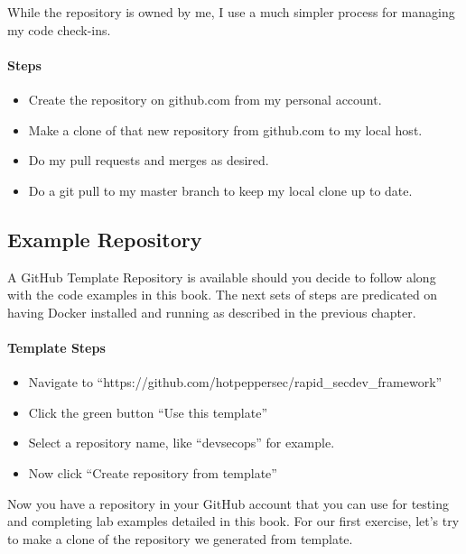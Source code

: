 \justify{}
While the repository is owned by me, I use a much simpler process for
managing my code check-ins.

\hypertarget{steps-2}{%
      \paragraph{Steps}\label{steps-2}}

\begin{itemize}
      \item
            Create the repository on github.com from my personal account.
      \item
            Make a clone of that new repository from github.com to my local host.
      \item
            Do my pull requests and merges as desired.
      \item
            Do a git pull to my master branch to keep my local clone up to date.
\end{itemize}
\subsection{Example Repository}
\justify{}
A GitHub Template Repository is available should you decide to follow
along with the code examples in this book. The next sets of steps are
predicated on having Docker installed and running as described in the
previous chapter.

\paragraph{Template Steps}
\begin{itemize}
      \item
            Navigate to ``https://github.com/hotpeppersec/rapid\_secdev\_framework''
      \item
            Click the green button ``Use this template''
      \item
            Select a repository name, like ``devsecops'' for
            example.
      \item
            Now click ``Create repository from template''
\end{itemize}

\justify{}
Now you have a repository in your GitHub account that you can use for
testing and completing lab examples detailed in this book. For our first
exercise, let's try to make a clone of the repository we generated from
template.


